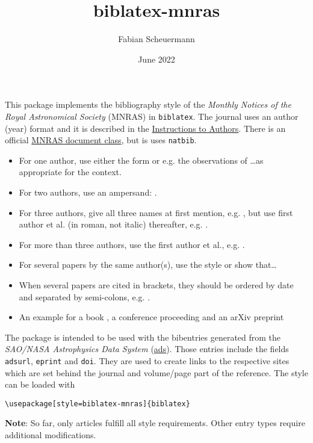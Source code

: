 \documentclass{scrartcl}
\title{biblatex-mnras}
\author{Fabian Scheuermann}
\date{June 2022}
\begin{document}
\maketitle

This package implements the bibliography style of the \emph{Monthly Notices of the Royal Astronomical Society} (MNRAS) in \texttt{biblatex}. The journal uses an author (year) format and it is described in the \href{https://academic.oup.com/mnras/pages/general_instructions?login=false#6.3\%20References\%20and\%20citations}{Instructions to Authors}. There is an official \href{https://www.ctan.org/tex-archive/macros/latex/contrib/mnras}{MNRAS document class}, but is uses \texttt{natbib}. \\

\begin{itemize}
  \setlength{\itemsep}{0pt}
    \item For one author, use either the form \parencite{Jacoby+1989a} or e.g. the observations of \textcite{Jacoby+1989a}\dots as appropriate for the context.
    \item For two authors, use an ampersand: \textcite{Ford+1978}. 
    \item For three authors, give all three names at first mention, e.g. \parencite{Baldwin+1981}, but use first author et al. (in roman, not italic) thereafter, e.g. \parencite{Baldwin+1981}.
    \item For more than three authors, use the first author et al., e.g. \parencite{Scheuermann+2022,Kreckel+2017}.
    \item For several papers by the same author(s), use the style \parencite{Jacoby+1989a,Jacoby1997} or \parencite{Anand+2021a,Anand+2021b} show that\dots
    \item When several papers are cited in brackets, they should be ordered by date and separated by semi-colons, e.g. \parencite{Lee+2022,Emsellem+2022,Leroy+2021a,Leroy+2021b}.
    \item An example for a book \parencite{Osterbrock+2006}, a conference proceeding \parencite{Ciardullo+2013} and an arXiv preprint \parencite{Barnes+2022}
\end{itemize}

The package is intended to be used with the bibentries generated from the \emph{SAO/NASA Astrophysics Data System} (\href{https://ui.adsabs.harvard.edu/}{ads}). Those entries include the fields \texttt{adsurl}, \texttt{eprint} and \texttt{doi}. They are used to create links to the respective sites which are set behind the journal and volume/page part of the reference. The style can be loaded with

\begin{verbatim}
\usepackage[style=biblatex-mnras]{biblatex}
\end{verbatim}

\textbf{Note}: So far, only articles fulfill all style requirements. Other entry types require additional modifications.

\newpage
\newrefcontext[sorting=nyt]
\printbibliography[title={References}]
\end{document}
